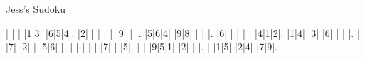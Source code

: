 Jess's Sudoku\vspace{0.2cm}
\begin{sudoku-block}| | | |1|3| |6|5|4|.
|2| | | | | |9| | |.
|5|6|4| |9|8| | | |.
|6| | | | | |4|1|2|.
|1|4| |3| |6| | | |.
| |7| |2| | |5|6| |.
| | | | | |7| | |5|.
| | |9|5|1| |2| | |.
| |1|5| |2|4| |7|9|.
\end{sudoku-block}